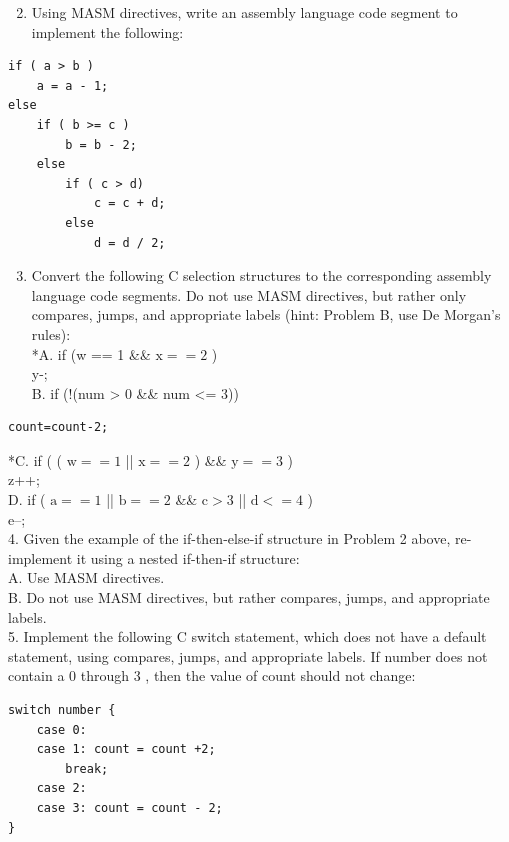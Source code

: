 \documentclass[10pt]{book}
\begin{document}
\begin{enumerate}
  \setcounter{enumi}{1}
  \item Using MASM directives, write an assembly language code segment to implement the following:
\end{enumerate}

\begin{verbatim}
if ( a > b )
    a = a - 1;
else
    if ( b >= c )
        b = b - 2;
    else
        if ( c > d)
            c = c + d;
        else
            d = d / 2;
\end{verbatim}

\begin{enumerate}
  \setcounter{enumi}{2}
  \item Convert the following C selection structures to the corresponding assembly language code segments. Do not use MASM directives, but rather only compares, jumps, and appropriate labels (hint: Problem B, use De Morgan's rules):\\
*A. if (w == 1 \&\& $\mathrm{x}==2$ )\\
y-;\\
B. if (!(num > 0 \&\& num <= 3))
\end{enumerate}

\begin{verbatim}
count=count-2;
\end{verbatim}

*C. if ( ( $\mathrm{w}==1$ || $\mathrm{x}==2$ ) \&\& $\mathrm{y}==3$ )\\
z++;\\
D. if ( $\mathrm{a}==1$ || $\mathrm{b}==2$ \&\& $\mathrm{c}>3$ || $\mathrm{d}<=4$ )\\
e--;\\
4. Given the example of the if-then-else-if structure in Problem 2 above, re-implement it using a nested if-then-if structure:\\
A. Use MASM directives.\\
B. Do not use MASM directives, but rather compares, jumps, and appropriate labels.\\
5. Implement the following C switch statement, which does not have a default statement, using compares, jumps, and appropriate labels. If number does not contain a 0 through 3 , then the value of count should not change:

\begin{verbatim}
switch number {
    case 0:
    case 1: count = count +2;
        break;
    case 2:
    case 3: count = count - 2;
}
\end{verbatim}
\end{document}
